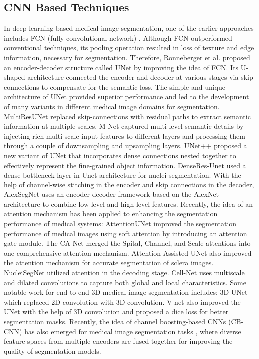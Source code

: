 \documentclass{article}
\begin{document}
\subsection{CNN Based Techniques}\label{CNN Based Techniques}

In deep learning based medical image segmentation, one of the earlier approaches includes FCN (fully convolutional network) \cite{long2015fully}. Although FCN outperformed conventional techniques, its pooling operation resulted in loss of texture and edge information, necessary for segmentation. Therefore, Ronneberger et al. \cite{ronneberger2015u} proposed an encoder-decoder structure called UNet by improving the idea of FCN. Its U-shaped architecture connected the encoder and decoder at various stages via skip-connections to compensate for the semantic loss. The simple and unique architecture of UNet provided superior performance and led to the development of many variants in different medical image domains for segmentation. MultiResUNet \cite{ibtehaz2020multiresunet} replaced skip-connections with residual paths to extract semantic information at multiple scales. M-Net \cite{fu2018joint} captured multi-level semantic details by injecting rich multi-scale input features to different layers and processing them through a couple of downsampling and upsampling layers. UNet++ \cite{zhou2019unet++} proposed a new variant of UNet that incorporates dense connections nested together to effectively represent the fine-grained object information. DenseRes-Unet \cite{kiran2022denseres} used a dense bottleneck layer in Unet architecture for nuclei segmentation. With the help of channel-wise stitching in the encoder and skip connections in the decoder, AlexSegNet \cite{singha2023alexsegnet} uses an encoder-decoder framework based on the AlexNet architecture to combine low-level and high-level features. Recently, the idea of an attention mechanism has been applied to enhancing the segmentation performance of medical systems: AttentionUNet \cite{oktay2018attention} improved the segmentation performance of medical images using soft attention by introducing an attention gate module. The CA-Net \cite{gu2020net} merged the Spital, Channel, and Scale attentions into one comprehensive attention mechanism. Attention Assisted UNet \cite{wang2019sclerasegnet} also improved the attention mechanism for accurate segmentation of sclera images. NucleiSegNet \cite{lal2021nucleisegnet} utilized attention in the decoding stage. Cell-Net \cite{shi2022fine} uses multiscale and dilated convolutions to capture both global and local characteristics. Some notable work for end-to-end 3D medical image segmentation includes: 3D UNet \cite{cciccek20163d} which replaced 2D convolution with 3D convolution. V-net \cite{milletari2016v} also improved the UNet with the help of 3D convolution and proposed a dice loss for better segmentation masks. Recently, the idea of channel boosting-based CNNs (CB-CNN) has also emerged for medical image segmentation tasks \cite{ali2022channel, aziz2020channel, sohail2021mitotic, ali2023cb}, where diverse feature spaces from multiple encoders are fused together for improving the quality of segmentation models.
\end{document}

